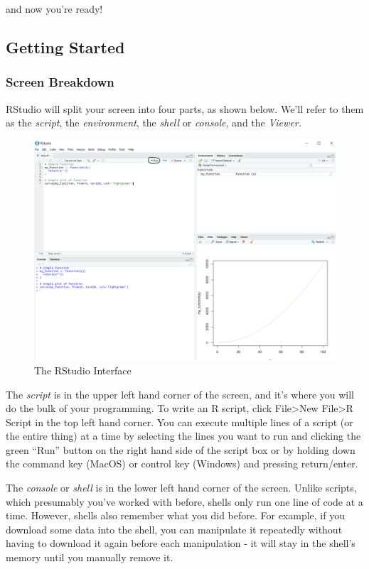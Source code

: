\documentclass[]{book}
\begin{document}
and now you're ready!

\subsection{Getting Started}\label{getting-started}

\subsubsection{Screen Breakdown}\label{screen-breakdown}

RStudio will split your screen into four parts, as shown below. We'll
refer to them as the \emph{script}, the \emph{environment}, the
\emph{shell} or \emph{console}, and the \emph{Viewer.}

\begin{figure}
\centering
\includegraphics{./images/rstudio2.PNG}
\caption{The RStudio Interface}
\end{figure}

The \emph{script} is in the upper left hand corner of the screen, and
it's where you will do the bulk of your programming. To write an R
script, click File\textgreater{}New File\textgreater{}R Script in the
top left hand corner. You can execute multiple lines of a script (or the
entire thing) at a time by selecting the lines you want to run and
clicking the green ``Run'' button on the right hand side of the script
box or by holding down the command key (MacOS) or control key (Windows)
and pressing return/enter.

The \emph{console} or \emph{shell} is in the lower left hand corner of
the screen. Unlike scripts, which presumably you've worked with before,
shells only run one line of code at a time. However, shells also
remember what you did before. For example, if you download some data
into the shell, you can manipulate it repeatedly without having to
download it again before each manipulation - it will stay in the shell's
memory until you manually remove it.
\end{document}
